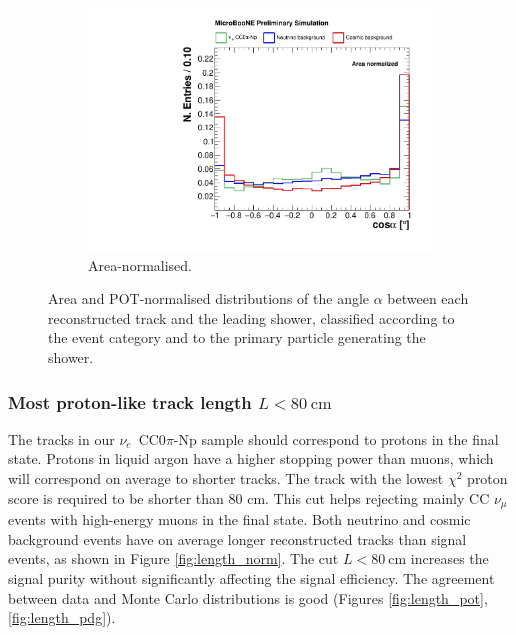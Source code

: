 \begin{figure}[htbp]
    \begin{subfigure}{0.49\textwidth}
    \includegraphics[width=\linewidth]{figures/h_track_shower_angle_norm.pdf}
    \caption{Area-normalised.} \label{fig:angle_integral}
  \end{subfigure}
  \caption{Area and POT-normalised distributions of the angle $\alpha$ between each reconstructed track and the leading shower, classified according to the event category and to the primary particle generating the shower.}
\end{figure}

\subsubsection*{Most proton-like track length $L < 80~\mathrm{cm}$}
The tracks in our $\nu_e$~CC0$\pi$-Np sample should correspond to protons in the final state. Protons in liquid argon have a higher stopping power than muons, which will correspond on average to shorter tracks. The track with the lowest $\chi^{2}$ proton score is required to be shorter than 80 cm. This cut helps rejecting mainly CC $\nu_{\mu}$ events with high-energy muons in the final state. 
Both neutrino and cosmic background events have on average longer reconstructed tracks than signal events, as shown in Figure \ref{fig:length_norm}. The cut $L < 80~$cm increases the signal purity without significantly affecting the signal efficiency. The agreement between data and Monte Carlo distributions is good (Figures \ref{fig:length_pot}, \ref{fig:length_pdg}). %

